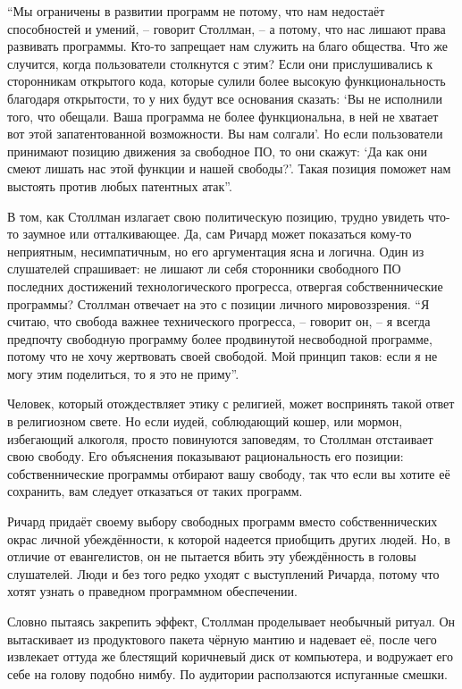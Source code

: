\enquote{Мы ограничены в развитии программ не потому, что нам недостаёт способностей и умений, -- говорит Столлман, -- а потому, что нас лишают права развивать программы. Кто-то запрещает нам служить на благо общества. Что же случится, когда пользователи столкнутся с этим? Если они прислушивались к сторонникам открытого кода, которые сулили более высокую функциональность благодаря открытости, то у них будут все основания сказать: \enquote{Вы не исполнили того, что обещали. Ваша программа не более функциональна, в ней не хватает вот этой запатентованной возможности. Вы нам солгали}. Но если пользователи принимают позицию движения за свободное ПО, то они скажут: \enquote{Да как они смеют лишать нас этой функции и нашей свободы?}. Такая позиция поможет нам выстоять против любых патентных атак}.

В том, как Столлман излагает свою политическую позицию, трудно увидеть что-то заумное или отталкивающее. Да, сам Ричард может показаться кому-то неприятным, несимпатичным, но его аргументация ясна и логична. Один из слушателей спрашивает: не лишают ли себя сторонники свободного ПО последних достижений технологического прогресса, отвергая собственнические программы? Столлман отвечает на это с позиции личного мировоззрения. \enquote{Я считаю, что свобода важнее технического прогресса, -- говорит он, -- я всегда предпочту свободную программу более продвинутой несвободной программе, потому что не хочу жертвовать своей свободой. Мой принцип таков: если я не могу этим поделиться, то я это не приму}.

Человек, который отождествляет этику с религией, может воспринять такой ответ в религиозном свете. Но если иудей, соблюдающий кошер, или мормон, избегающий алкоголя, просто повинуются заповедям, то Столлман отстаивает свою свободу. Его объяснения показывают рациональность его позиции: собственнические программы отбирают вашу свободу, так что если вы хотите её сохранить, вам следует отказаться от таких программ.

Ричард придаёт своему выбору свободных программ вместо собственнических окрас личной убеждённости, к которой надеется приобщить других людей. Но, в отличие от евангелистов, он не пытается вбить эту убеждённость в головы слушателей. Люди и без того редко уходят с выступлений Ричарда, потому что хотят узнать о праведном программном обеспечении.

Словно пытаясь закрепить эффект, Столлман проделывает необычный ритуал. Он вытаскивает из продуктового пакета чёрную мантию и надевает её, после чего извлекает оттуда же блестящий коричневый диск от компьютера, и водружает его себе на голову подобно нимбу. По аудитории расползаются испуганные смешки.


